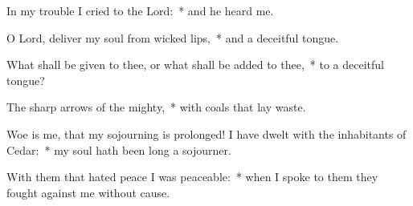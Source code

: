 \begin{enpars}
\item In my trouble I cried to the Lord:~* and he heard me.
\item O Lord, deliver my soul from wicked lips,~* and a deceitful tongue.
\item What shall be given to thee, or what shall be added to thee,~* to a deceitful tongue?
\item The sharp arrows of the mighty,~* with coals that lay waste.
\item Woe is me, that my sojourning is prolonged! I have dwelt with the inhabitants of Cedar:~* my soul hath been long a sojourner.
\item With them that hated peace I was peaceable:~* when I spoke to them they fought against me without cause.
\end{enpars}